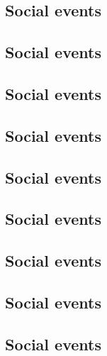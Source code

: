 \subsection{Social events}

\clearpage

\subsection{Social events}

\clearpage

\subsection{Social events}

\clearpage

\subsection{Social events}

\clearpage

\subsection{Social events}

\clearpage

\subsection{Social events}

\clearpage

\subsection{Social events}

\clearpage

\subsection{Social events}

\clearpage

\subsection{Social events}

\clearpage


